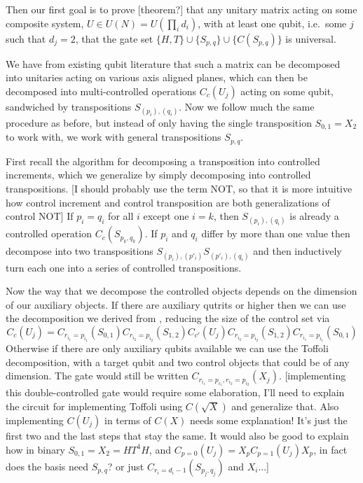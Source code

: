 \documentclass[]{article}
\begin{document}
Then our first goal is to prove [theorem?] that any unitary matrix acting on some composite system, $U \in U(N) = U(\prod_i d_i)$, with at least one qubit, i.e.\ some $j$ such that $d_j = 2$, that the gate set $\{H, T\} \cup \{S_{p,q}\} \cup \{C(S_{p,q})\}$ is universal.

We have from existing qubit literature that such a matrix can be decomposed into unitaries acting on various axis aligned planes, which can then be decomposed into multi-controlled operations $C_c(U_j)$ acting on some qubit, sandwiched by transpositions $S_{(p_i),(q_i)}$. Now we follow much the same procedure as before, but instead of only having the single transposition $S_{0, 1} = X_2$ to work with, we work with general transpositions $S_{p, q}$.

First recall the algorithm for decomposing a transposition into controlled increments, which we generalize by simply decomposing into controlled transpositions. [I should probably use the term NOT, so that it is more intuitive how control increment and control transposition are both generalizations of control NOT] If $p_i = q_i$ for all $i$ except one $i = k$, then $S_{(p_i), (q_i)}$ is already a controlled operation $C_c(S_{p_k,q_k})$. If $p_i$ and $q_i$ differ by more than one value then decompose into two transpositions $S_{(p_i), (p'_i)}S_{(p'_i), (q_i)}$ and then inductively turn each one into a series of controlled transpositions.

Now the way that we decompose the controlled objects depends on the dimension of our auxiliary objects. If there are auxiliary qutrits or higher then we can use the decomposition we derived from \cite{multi-valued-logic}, reducing the size of the control set via
\[
C_c(U_j) = C_{r_{i_1}=p_{i_1}}(S_{0,1})
C_{r_{i_2}=p_{i_2}}(S_{1,2})
C_{c'}(U_j)
C_{r_{i_2}=p_{i_2}}(S_{1,2})
C_{r_{i_1}=p_{i_1}}(S_{0,1})
\]
Otherwise if there are only auxiliary qubits available we can use the Toffoli decomposition, with a target qubit and two control objects that could be of any dimension. The gate would still be written $C_{r_{i_1}=p_{i_1},r_{i_2}=p_{i_2}}(X_j)$. [implementing this double-controlled gate would require some elaboration, I'll need to explain the circuit for implementing Toffoli using $C(\sqrt{X})$ and generalize that. Also implementing $C(U_j)$ in terms of $C(X)$ needs some explanation! It's just the first two and the last steps that stay the same. It would also be good to explain how in binary $S_{0,1} = X_2 = HT^4H$, and $C_{p=0}(U_j) = X_pC_{p=1}(U_j)X_p$, in fact does the basis need $S_{p,q}$? or just $C_{r_i=d_i-1}(S_{p_j,q_j})$ and $X_i$...]
\end{document}

